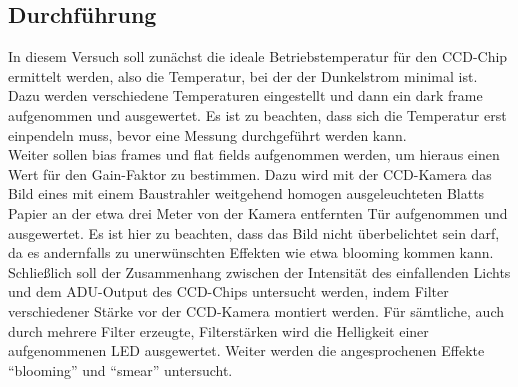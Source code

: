 \subsection{Durchführung}
In diesem Versuch soll zunächst die ideale Betriebstemperatur für den CCD-Chip ermittelt werden, also die Temperatur, bei der der Dunkelstrom minimal ist. Dazu werden verschiedene Temperaturen eingestellt und dann ein dark frame aufgenommen und ausgewertet. Es ist zu beachten, dass sich die Temperatur erst einpendeln muss, bevor eine Messung durchgeführt werden kann. \\
Weiter sollen bias frames und flat fields aufgenommen werden, um hieraus einen Wert für den Gain-Faktor zu bestimmen. Dazu wird mit der CCD-Kamera das Bild eines mit einem Baustrahler weitgehend homogen ausgeleuchteten Blatts Papier an der etwa drei Meter von der Kamera entfernten Tür aufgenommen und ausgewertet. Es ist hier zu beachten, dass das Bild nicht überbelichtet sein darf, da es andernfalls zu unerwünschten Effekten wie etwa blooming kommen kann. \\
Schließlich soll der Zusammenhang zwischen der Intensität des einfallenden Lichts und dem ADU-Output des CCD-Chips untersucht werden, indem Filter verschiedener Stärke vor der CCD-Kamera montiert werden. Für sämtliche, auch durch mehrere Filter erzeugte, Filterstärken wird die Helligkeit einer aufgenommenen LED ausgewertet. Weiter werden die angesprochenen Effekte \enquote{blooming} und \enquote{smear} untersucht. 